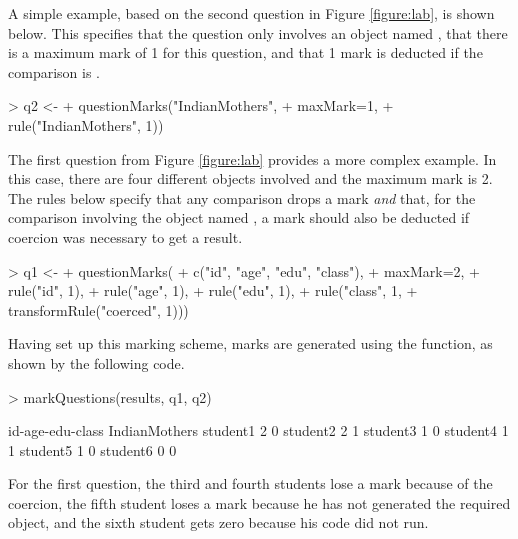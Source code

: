 A simple example, based on the second question in Figure
\ref{figure:lab}, is shown below.  This specifies that the question only
involves an object named , that there is a maximum
mark of 1 for this question, and that 1 mark is deducted if the 
comparison is .

\begin{Schunk}
\begin{Sinput}
> q2 <- 
+     questionMarks("IndianMothers",
+                   maxMark=1,
+                   rule("IndianMothers", 1))
\end{Sinput}
\end{Schunk}
The first question from Figure \ref{figure:lab} provides a more
complex example.  In this case, there are four different objects
involved and the maximum mark is 2.  The rules below specify that
any  comparison drops a mark \emph{and} that, for
the comparison involving the object named , 
a mark should also be deducted 
if coercion was necessary to get
a  result. 

\begin{Schunk}
\begin{Sinput}
> q1 <- 
+     questionMarks(
+         c("id", "age", "edu", "class"),
+         maxMark=2,
+         rule("id", 1),
+         rule("age", 1),
+         rule("edu", 1),
+         rule("class", 1,
+              transformRule("coerced", 1)))
\end{Sinput}
\end{Schunk}
Having set up this marking scheme, marks are generated using 
the  function, as shown by the following code.

\begin{Schunk}
\begin{Sinput}
> markQuestions(results, q1, q2)
\end{Sinput}
\begin{Soutput}
         id-age-edu-class IndianMothers
student1                2             0
student2                2             1
student3                1             0
student4                1             1
student5                1             0
student6                0             0
\end{Soutput}
\end{Schunk}
For the first question, the third and fourth students lose a mark because
of the coercion, the fifth student loses a mark because he has not generated 
the required object, and the sixth student gets zero because his code did
not run.

